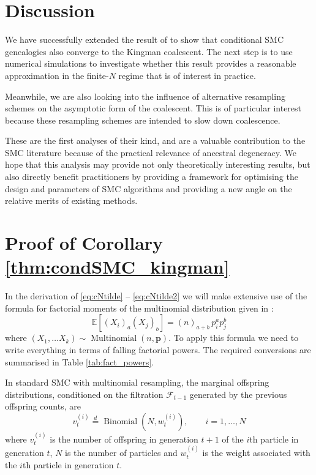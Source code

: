 \documentclass[fleqn]{article}
\theoremstyle{definition}
\newcommand{\E}{\mathbb{E}}
\newcommand{\eqdist}{\overset{d}{=}}
\newcommand{\Mn}{\operatorname{Multinomial}}
\newcommand{\Bin}{\operatorname{Binomial}}
\newcommand{\F}{\mathcal{F}_{t-1}}
\newcommand{\vt}[2][t]{v_{#1}^{(#2)}}
\newcommand{\wt}[2][t]{w_{#1}^{(#2)}}
\begin{document}
\section{Discussion}\label{sec:discussion}
We have successfully extended the result of \citet{koskela2018} to show that conditional SMC genealogies also converge to the Kingman coalescent. The next step is to use numerical simulations to investigate whether this result provides a reasonable approximation in the finite-$N$ regime that is of interest in practice.

Meanwhile, we are also looking into the influence of alternative resampling schemes on the asymptotic form of the coalescent. This is of particular interest because these resampling schemes are intended to slow down coalescence.

These are the first analyses of their kind, and are a valuable contribution to the SMC literature because of the practical relevance of ancestral degeneracy. We hope that this analysis may provide not only theoretically interesting results, but also directly benefit practitioners by providing a framework for optimising the design and parameters of SMC algorithms and providing a new angle on the relative merits of existing methods.


\appendix
\section{Proof of Corollary \ref{thm:condSMC_kingman}}
In the derivation of \eqref{eq:cNtilde} -- \eqref{eq:cNtilde2} we will make extensive use of the formula for factorial moments of the multinomial distribution given in \citet[p.67]{mosimann1962}:
\begin{equation} \label{eq:mn_moments}
\E[(X_i)_a(X_j)_b] = (n)_{a+b}\, p_i^a p_j^b
\end{equation}
where $(X_1,\dots X_k) \sim \Mn(n, \mathbf{p})$.
To apply this formula we need to write everything in terms of falling factorial powers. The required conversions are summarised in Table \ref{tab:fact_powers}.

In standard SMC with multinomial resampling, the marginal offspring distributions, conditioned on the filtration $\F$ generated by the previous offspring counts, are
\begin{equation*}
\vt{i} \eqdist \Bin (N, \wt{i}), \qquad i=1,\dots,N
\end{equation*}
where $\vt{i}$ is the number of offspring in generation $t+1$ of the $i$th particle in generation $t$, $N$ is the number of particles and $\wt{i}$ is the weight associated with the $i$th particle in generation $t$.
\end{document}
